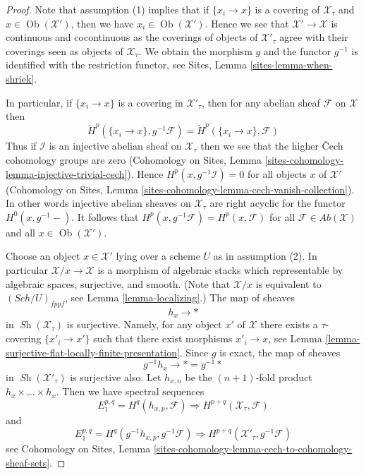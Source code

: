 \documentclass[10pt,a4paper]{amsart}
\theoremstyle{plain}
\theoremstyle{definition}
\theoremstyle{remark}
\numberwithin{equation}{subsection}
\def\Sch{\mathit{Sch}}
\def\Ob{\mathop{\mathrm{Ob}}\nolimits}
\def\Sh{\mathop{\mathit{Sh}}\nolimits}
\begin{document}
\begin{proof}
Note that assumption (1) implies that if $\{x_i \to x\}$ is a covering
of $\mathcal{X}_\tau$ and $x \in \Ob(\mathcal{X}')$, then we have
$x_i \in \Ob(\mathcal{X}')$. Hence we see that $\mathcal{X}' \to \mathcal{X}$
is continuous and cocontinuous as the coverings of objects of
$\mathcal{X}'_\tau$ agree with their coverings seen as objects of
$\mathcal{X}_\tau$. We obtain the morphism $g$ and the functor
$g^{-1}$ is identified with the restriction functor, see
Sites, Lemma \ref{sites-lemma-when-shriek}.

\medskip\noindent
In particular, if $\{x_i \to x\}$ is a covering in $\mathcal{X}'_\tau$,
then for any abelian sheaf $\mathcal{F}$ on $\mathcal{X}$ then
$$
\check H^p(\{x_i \to x\}, g^{-1}\mathcal{F}) =
\check H^p(\{x_i \to x\}, \mathcal{F})
$$
Thus if $\mathcal{I}$ is an injective abelian sheaf on $\mathcal{X}_\tau$
then we see that the higher {\v C}ech cohomology groups are zero
(Cohomology on Sites,
Lemma \ref{sites-cohomology-lemma-injective-trivial-cech}).
Hence $H^p(x, g^{-1}\mathcal{I}) = 0$ for all objects $x$
of $\mathcal{X}'$
(Cohomology on Sites,
Lemma \ref{sites-cohomology-lemma-cech-vanish-collection}).
In other words injective abelian sheaves on $\mathcal{X}_\tau$
are right acyclic for the functor $H^0(x, g^{-1}-)$.
It follows that $H^p(x, g^{-1}\mathcal{F}) = H^p(x, \mathcal{F})$
for all $\mathcal{F} \in \textit{Ab}(\mathcal{X})$ and all
$x \in \Ob(\mathcal{X}')$.

\medskip\noindent
Choose an object $x \in \mathcal{X}'$ lying over a scheme $U$
as in assumption (2). In particular $\mathcal{X}/x \to \mathcal{X}$
is a morphism of algebraic stacks which representable by algebraic spaces,
surjective, and smooth. (Note that $\mathcal{X}/x$ is equivalent to
$(\Sch/U)_{fppf}$, see Lemma \ref{lemma-localizing}.)
The map of sheaves
$$
h_x \longrightarrow *
$$
in $\Sh(\mathcal{X}_\tau)$ is surjective. Namely, for any object $x'$
of $\mathcal{X}$ there exists a $\tau$-covering $\{x'_i \to x'\}$
such that there exist morphisms $x'_i \to x$, see
Lemma \ref{lemma-surjective-flat-locally-finite-presentation}.
Since $g$ is exact, the map of sheaves
$$
g^{-1}h_x \longrightarrow * = g^{-1}*
$$
in $\Sh(\mathcal{X}'_\tau)$ is surjective also. Let $h_{x, n}$ be
the $(n + 1)$-fold product $h_x \times \ldots \times h_x$.
Then we have spectral sequences
\begin{equation}
\label{equation-spectral-sequence-one}
E_1^{p, q} = H^q(h_{x, p}, \mathcal{F}) \Rightarrow
H^{p + q}(\mathcal{X}_\tau, \mathcal{F})
\end{equation}
and
\begin{equation}
\label{equation-spectral-sequence-two}
E_1^{p, q} = H^q(g^{-1}h_{x, p}, g^{-1}\mathcal{F}) \Rightarrow
H^{p + q}(\mathcal{X}'_\tau, g^{-1}\mathcal{F})
\end{equation}
see Cohomology on Sites,
Lemma \ref{sites-cohomology-lemma-cech-to-cohomology-sheaf-sets}.


\end{proof}
\end{document}

